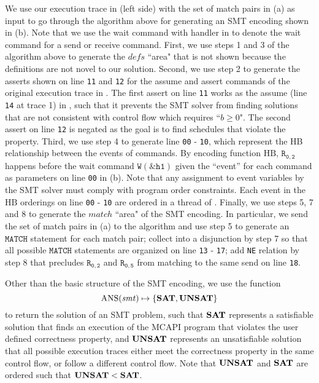 We use our execution trace in  (left side) with the set of match pairs in (a) as input to go through the algorithm above for generating an SMT encoding shown in (b). Note that we use the wait command with handler in  to denote the wait command for a send or receive command. First, we use steps 1 and 3 of the algorithm above to generate the $\mathit{defs}$ ``area" that is not shown because the definitions are not novel to our solution. Second, we use step 2 to generate the asserts shown on line \texttt{11} and \texttt{12} for the assume and assert commands of the original execution trace in . The first assert on line \texttt{11} works as the assume (line \texttt{14} at trace 1) in , such that it prevents the SMT solver from finding solutions that are not consistent with control flow which requires ``$b \ge 0$". The second assert on line \texttt{12} is negated as the goal is to find schedules that violate the property. Third, we use step 4 to generate line \texttt{00} - \texttt{10}, which represent the HB relationship between the events of commands. By encoding function $\mathrm{HB}$, $\mathtt{R_{0,2}}$ happens before the wait command $\mathtt{W(\&h1)}$ given the ``event'' for each command as parameters on line \texttt{00} in (b). Note that any assignment to event variables by the SMT solver must comply with program order constraints. Each event in the $\mathrm{HB}$ orderings on line \texttt{00} - \texttt{10} are ordered in a thread of . Finally, we use steps 5, 7 and 8 to generate the $\mathit{match}$ ``area" of the SMT encoding. In particular, we send the set of match pairs in (a) to the algorithm and use step 5 to generate an $\mathtt{MATCH}$ statement for each match pair; collect into a disjunction by step 7 so that all possible $\mathtt{MATCH}$ statements are organized on line \texttt{13} - \texttt{17}; add \texttt{NE} relation by step 8 that precludes $\mathtt{R_{0,2}}$ and $\mathtt{R_{0,5}}$ from matching to the same send on line \texttt{18}.

Other than the basic structure of the SMT encoding, we use the function
\[\mathrm{ANS}(\mathit{smt}) \mapsto \{\mathrm{\textbf{SAT}},\mathrm{\textbf{UNSAT}}\} \]
to return the solution of an SMT problem, such that $\mathrm{\textbf{SAT}}$ represents a satisfiable solution that finds an execution of the MCAPI program that violates the user defined correctness property, and $\mathrm{\textbf{UNSAT}}$ represents an unsatisfiable solution that all possible execution traces either meet the correctness property in the same control flow, or follow a different control flow. Note that $\mathrm{\textbf{UNSAT}}$ and $\mathrm{\textbf{SAT}}$ are ordered such that $\mathrm{\textbf{UNSAT}} < \mathrm{\textbf{SAT}}$.


